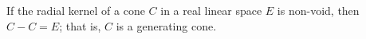 If the radial kernel of a cone $C$ in a real linear space $E$ is non-void, then $C - C = E$; that is, $C$ is a generating cone.
